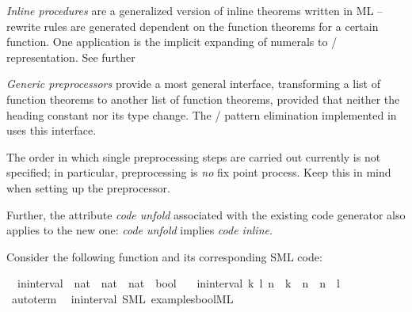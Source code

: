 \begin{isabellebody}
\begin{isamarkuptext}
  \emph{Inline procedures} are a generalized version of inline
  theorems written in ML -- rewrite rules are generated dependent
  on the function theorems for a certain function.  One
  application is the implicit expanding of  numerals
  to  /  representation.  See further

  \emph{Generic preprocessors} provide a most general interface,
  transforming a list of function theorems to another
  list of function theorems, provided that neither the heading
  constant nor its type change.  The  / 
  pattern elimination implemented in  uses this
  interface.

  \begin{warn}
    The order in which single preprocessing steps are carried
    out currently is not specified; in particular, preprocessing
    is \emph{no} fix point process.  Keep this in mind when
    setting up the preprocessor.

    Further, the attribute \emph{code unfold}
    associated with the existing code generator also applies to
    the new one: \emph{code unfold} implies \emph{code inline}.
  \end{warn}%
\end{isamarkuptext}%
\isamarkuptrue%
%
\isamarkuptrue%
%
\begin{isamarkuptext}%
Consider the following function and its corresponding
  SML code:%
\end{isamarkuptext}%
\isamarkuptrue%
\isamarkupfalse%
\isanewline
\ \ in{\isacharunderscore}interval\ {\isacharcolon}{\isacharcolon}\ {\isachardoublequoteopen}nat\ {\isasymtimes}\ nat\ {\isasymRightarrow}\ nat\ {\isasymRightarrow}\ bool{\isachardoublequoteclose}\ \isanewline
\ \ {\isachardoublequoteopen}in{\isacharunderscore}interval\ {\isacharparenleft}k{\isacharcomma}\ l{\isacharparenright}\ n\ {\isasymlongleftrightarrow}\ k\ {\isasymle}\ n\ {\isasymand}\ n\ {\isasymle}\ l{\isachardoublequoteclose}\isanewline
{}\isamarkupfalse%
%
\isadelimproof
\ %
\endisadelimproof
%
\isatagproof
{}\isamarkupfalse%
\ {\isacharparenleft}auto{\isacharunderscore}term\ {\isachardoublequoteopen}{\isacharbraceleft}{\isacharbraceright}{\isachardoublequoteclose}{\isacharparenright}%
\endisatagproof
{\isafoldproof}%
%
\isadelimproof
%
\endisadelimproof
\isanewline
{}\isamarkupfalse%
\ in{\isacharunderscore}interval\ {\isacharparenleft}SML\ {\isachardoublequoteopen}examples{\isacharslash}bool{}{\isachardot}ML{\isachardoublequoteclose}{\isacharparenright}%
\begin{isamarkuptext}%


\end{isamarkuptext}
\end{isabellebody}
